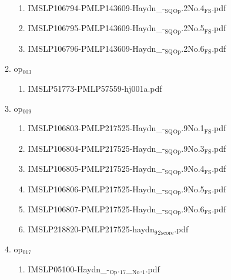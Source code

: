 \documentclass[11pt]{article}
\begin{document}
\begin{enumerate}
\begin{enumerate}
\begin{enumerate}
\item IMSLP106794-PMLP143609-Haydn\_-$_{\text{SQ}}$$_{\text{Op}}$.2No.4$_{\text{FS}}$.pdf
\label{sec-1-1-1-1-44-38-6-2-4}

\item IMSLP106795-PMLP143609-Haydn\_-$_{\text{SQ}}$$_{\text{Op}}$.2No.5$_{\text{FS}}$.pdf
\label{sec-1-1-1-1-44-38-6-2-5}

\item IMSLP106796-PMLP143609-Haydn\_-$_{\text{SQ}}$$_{\text{Op}}$.2No.6$_{\text{FS}}$.pdf
\label{sec-1-1-1-1-44-38-6-2-6}
\end{enumerate}

\item op$_{\text{003}}$
\label{sec-1-1-1-1-44-38-6-3}
\begin{enumerate}
\item IMSLP51773-PMLP57559-hj001a.pdf
\label{sec-1-1-1-1-44-38-6-3-1}
\end{enumerate}

\item op$_{\text{009}}$
\label{sec-1-1-1-1-44-38-6-4}
\begin{enumerate}
\item IMSLP106803-PMLP217525-Haydn\_-$_{\text{SQ}}$$_{\text{Op}}$.9No.1$_{\text{FS}}$.pdf
\label{sec-1-1-1-1-44-38-6-4-1}

\item IMSLP106804-PMLP217525-Haydn\_-$_{\text{SQ}}$$_{\text{Op}}$.9No.3$_{\text{FS}}$.pdf
\label{sec-1-1-1-1-44-38-6-4-2}

\item IMSLP106805-PMLP217525-Haydn\_-$_{\text{SQ}}$$_{\text{Op}}$.9No.4$_{\text{FS}}$.pdf
\label{sec-1-1-1-1-44-38-6-4-3}

\item IMSLP106806-PMLP217525-Haydn\_-$_{\text{SQ}}$$_{\text{Op}}$.9No.5$_{\text{FS}}$.pdf
\label{sec-1-1-1-1-44-38-6-4-4}

\item IMSLP106807-PMLP217525-Haydn\_-$_{\text{SQ}}$$_{\text{Op}}$.9No.6$_{\text{FS}}$.pdf
\label{sec-1-1-1-1-44-38-6-4-5}

\item IMSLP218820-PMLP217525-haydn$_{\text{9}}$$_{\text{2}}$$_{\text{score}}$.pdf
\label{sec-1-1-1-1-44-38-6-4-6}
\end{enumerate}

\item op$_{\text{017}}$
\label{sec-1-1-1-1-44-38-6-5}
\begin{enumerate}
\item IMSLP05100-Haydn\_-$_{\text{Op}}$.$_{\text{17}}$\_$_{\text{No}}$.$_{\text{1}}$.pdf
\label{sec-1-1-1-1-44-38-6-5-1}


\end{enumerate}
\end{enumerate}
\end{enumerate}
\end{document}
